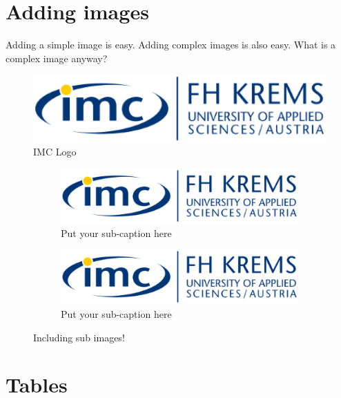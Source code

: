 \documentclass{imc-inf}
\begin{document}
\section{Adding images}
Adding a simple image is easy. Adding complex images is also easy. What is a complex image anyway? 
\begin{figure}[h]
	\centering
	\includegraphics[width=1.0\textwidth]{imclogo.png}
	\caption{IMC Logo}
	\label{fig:logo}
\end{figure}





\begin{figure}[ht]
	\begin{subfigure}{.5\textwidth}
		\centering
		\includegraphics[width=.8\linewidth]{imclogo.png}  
		\caption{Put your sub-caption here}
		\label{fig:sub-first}
	\end{subfigure}
	\begin{subfigure}{.5\textwidth}
		\centering
		\includegraphics[width=.8\linewidth]{imclogo.png}  
		\caption{Put your sub-caption here}
		\label{fig:sub-second}
	\end{subfigure}
	\caption{Including sub images! }
	\label{fig:fig}
\end{figure}

\section{Tables}
\end{document}
